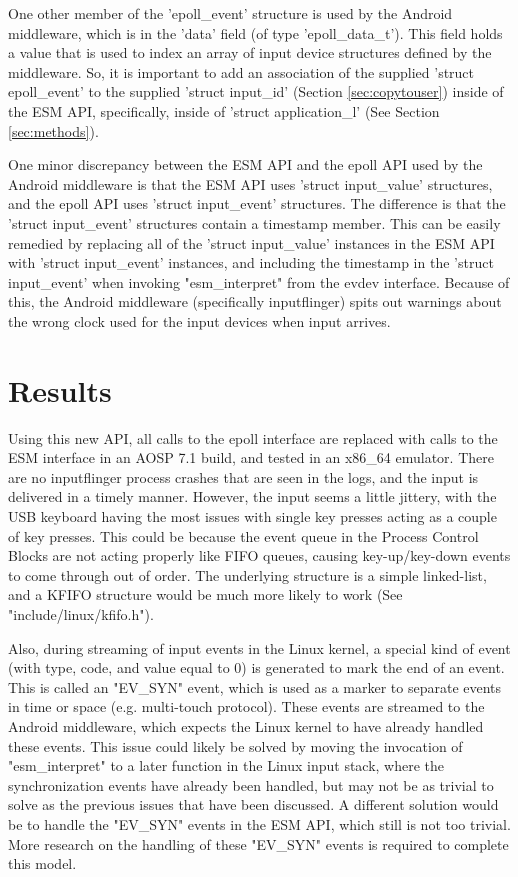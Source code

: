 \documentclass[10pt,journal,compsoc]{IEEEtran}
\begin{document}
One other member of the 'epoll\_event' structure is used by the Android middleware, which is in the 'data' field (of type 'epoll\_data\_t'). This field holds a value that is used to index an array of input device structures defined by the middleware. So, it is important to add an association of the supplied 'struct epoll\_event' to the supplied 'struct input\_id' (Section \ref{sec:copytouser}) inside of the ESM API, specifically, inside of 'struct application\_l' (See Section \ref{sec:methods}).

One minor discrepancy between the ESM API and the epoll API used by the Android middleware is that the ESM API uses 'struct input\_value' structures, and the epoll API uses 'struct input\_event' structures. The difference is that the 'struct input\_event' structures contain a timestamp member. This can be easily remedied by replacing all of the 'struct input\_value' instances in the ESM API with 'struct input\_event' instances, and including the timestamp in the 'struct input\_event' when invoking "esm\_interpret" from the evdev interface. Because of this, the Android middleware (specifically inputflinger) spits out warnings about the wrong clock used for the input devices when input arrives.

\section{Results}
\label{sec:results}
Using this new API, all calls to the epoll interface are replaced with calls to the ESM interface in an AOSP 7.1 build, and tested in an x86\_64 emulator. There are no inputflinger process crashes that are seen in the logs, and the input is delivered in a timely manner. However, the input seems a little jittery, with the USB keyboard having the most issues with single key presses acting as a couple of key presses. This could be because the event queue in the Process Control Blocks are not acting properly like FIFO queues, causing key-up/key-down events to come through out of order. The underlying structure is a simple linked-list, and a KFIFO structure would be much more likely to work (See "include/linux/kfifo.h").

Also, during streaming of input events in the Linux kernel, a special kind of event (with type, code, and value equal to 0) is generated to mark the end of an event. This is called an "EV\_SYN" event, which is used as a marker to separate events in time or space (e.g. multi-touch protocol). These events are streamed to the Android middleware, which expects the Linux kernel to have already handled these events. This issue could likely be solved by moving the invocation of "esm\_interpret" to a later function in the Linux input stack, where the synchronization events have already been handled, but may not be as trivial to solve as the previous issues that have been discussed. A different solution would be to handle the "EV\_SYN" events in the ESM API, which still is not too trivial. More research on the handling of these "EV\_SYN" events is required to complete this model.
\end{document}
